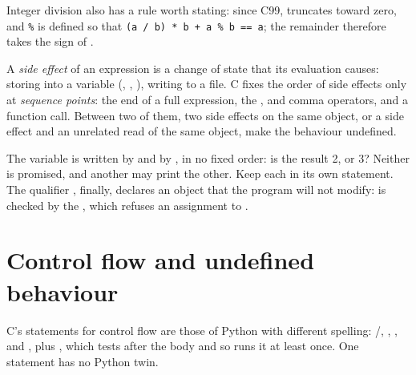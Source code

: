 Integer division also has a rule worth stating: since C99,  truncates toward zero, and \texttt{\%} is
defined so that \texttt{(a / b) * b + a \% b == a}; the remainder therefore takes the sign of .


\label{out:b1:c-types-and-control:division}

\begin{definition}\label{def:b1:c-types-and-control:side-effect}
A \emph{side effect} of an expression is a change of state that its evaluation causes: storing
into a variable (\code{=}, \code{++}, \code{+=}), writing to a file. C fixes the order of side effects only at
\emph{sequence points}: the end of a full expression, the \code{&&}, \code{||} and comma
operators, and a function call. Between two of them, two side effects on the same object, or a side effect and an
unrelated read of the same object, make the behaviour undefined.
\end{definition}



The variable  is written by \code{++} and by \code{=}, in no fixed order: is the result 2, or 3? Neither is
promised, and another  may print the other. Keep each  in its own statement. The qualifier
, finally, declares an object that the program will not modify:  is checked
by the , which refuses an assignment to .

\section{Control flow and undefined behaviour}\label{sec:b1:c-types-and-control:ub}

C's statements for control flow are those of Python with different spelling: /,
, ,  and , plus ,
which tests after the body and so runs it at least once. One statement has no Python twin.

